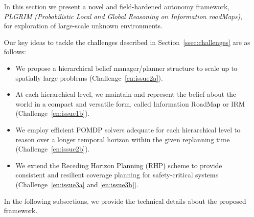 \documentclass[letterpaper]{article} %
\newcommand{\phdone}[1]{} %
\begin{document}
\phdone{Framework Overview}



In this section we present a novel and field-hardened autonomy framework, \textit{PLGRIM (Probabilistic Local and Global Reasoning on Information roadMaps)}, for exploration of large-scale unknown environments.

Our key ideas to tackle the challenges described in Section~\ref{ssec:challenges} are as follows:
\begin{itemize}
  \item We propose a hierarchical belief manager/planner structure to scale up to spatially large problems (Challenge~\ref{en:issue2a}).
  \item At each hierarchical level, we maintain and represent the belief about the world in a compact and versatile form, called Information RoadMap  or IRM (Challenge~\ref{en:issue1b}).
  \item We employ efficient POMDP solvers adequate for each hierarchical level to reason over a longer temporal horizon within the given replanning time (Challenge~\ref{en:issue2b}).
  \item We extend the Receding Horizon Planning (RHP) scheme to provide consistent and resilient coverage planning for safety-critical systems (Challenge~\ref{en:issue3a} and \ref{en:issue3b}).
\end{itemize}

In the following subsections, we provide the technical details about the proposed framework.

\end{document}
